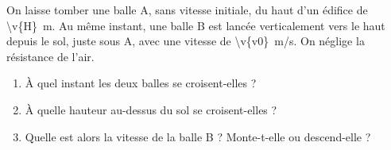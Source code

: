 On laisse tomber une balle A, sans vitesse initiale, du haut d'un édifice de \qty{\v{H}}{m}. Au même instant, une balle B est lancée verticalement vers le haut depuis le sol, juste sous A, avec une vitesse de \qty{\v{v0}}{m/s}. On néglige la résistance de l'air.

\begin{enumerate}[label=\alph*)]
    \item À quel instant les deux balles se croisent-elles ?
    \item À quelle hauteur au-dessus du sol se croisent-elles ?
    \item Quelle est alors la vitesse de la balle B ? Monte-t-elle ou descend-elle ?
\end{enumerate}
